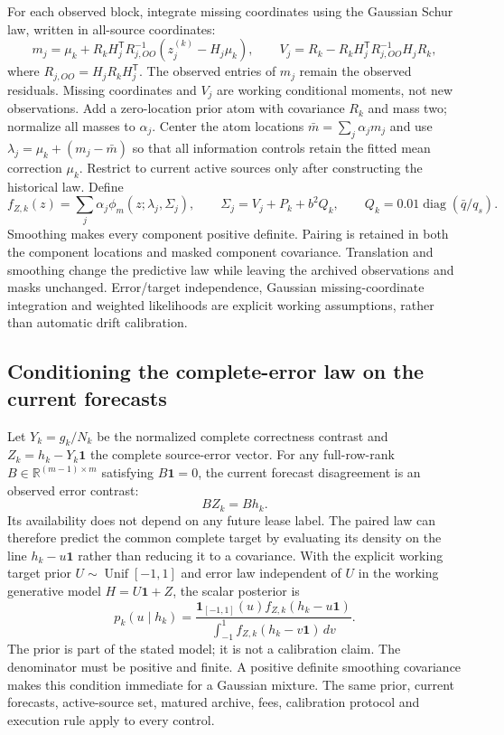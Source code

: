 \documentclass[10pt]{article}
\DeclareMathOperator{\diag}{diag}
\begin{document}
For each observed block, integrate missing coordinates using the Gaussian
Schur law, written in all-source coordinates:
\begin{equation}
 m_j=\mu_k+R_kH_j^{\mathsf T}R_{j,OO}^{-1}
       (z_j^{(k)}-H_j\mu_k),\qquad
 V_j=R_k-R_kH_j^{\mathsf T}R_{j,OO}^{-1}H_jR_k,
 \label{eq:masked-atoms}
\end{equation}
where $R_{j,OO}=H_jR_kH_j^{\mathsf T}$. The observed entries of $m_j$
remain the observed residuals. Missing coordinates and $V_j$ are working
conditional moments, not new observations. Add a zero-location prior atom
with covariance $R_k$ and mass two; normalize all masses to $\alpha_j$.
Center the atom locations $\bar m=\sum_j\alpha_jm_j$ and use
$\lambda_j=\mu_k+(m_j-\bar m)$ so that all information controls retain
the fitted mean correction $\mu_k$. Restrict to current active sources
only after constructing the historical law. Define
\begin{equation}
 f_{Z,k}(z)=\sum_j\alpha_j\phi_m(z;\lambda_j,\Sigma_j),\qquad
 \Sigma_j=V_j+P_k+b^2Q_k,\qquad
 Q_k=0.01\diag(\bar q/q_s).
 \label{eq:paired-error-law}
\end{equation}
Smoothing makes every component positive definite. Pairing is retained in
both the component locations and masked component covariance. Translation
and smoothing change the predictive law while leaving the archived
observations and masks unchanged. Error/target independence, Gaussian
missing-coordinate integration and weighted likelihoods are explicit
working assumptions, rather than automatic drift calibration.

\subsection{Conditioning the complete-error law on the current forecasts}
Let $Y_k=g_k/N_k$ be the normalized complete correctness contrast and
$Z_k=h_k-Y_k\mathbf1$ the complete source-error vector.  For any full-row-rank
$B\in\mathbb R^{(m-1)\times m}$ satisfying $B\mathbf1=0$, the current
forecast disagreement is an observed error contrast:
\begin{equation}
 BZ_k=Bh_k.
 \label{eq:conditional-disagreement-identity}
\end{equation}
Its availability does not depend on any future lease label.  The paired
law can therefore predict the common complete target by evaluating its
density on the line $h_k-u\mathbf1$ rather than reducing it to a covariance.
With the explicit working target prior $U\sim\operatorname{Unif}[-1,1]$
and error law independent of $U$ in the working generative model
$H=U\mathbf1+Z$, the scalar posterior is
\begin{equation}
 p_k(u\mid h_k)=
 \frac{\mathbf1_{[-1,1]}(u)f_{Z,k}(h_k-u\mathbf1)}
 {\int_{-1}^{1}f_{Z,k}(h_k-v\mathbf1)\,dv}.
 \label{eq:complete-target-line-posterior}
\end{equation}
The prior is part of the stated model; it is not a calibration claim.
The denominator must be positive and finite.  A positive definite smoothing
covariance makes this condition immediate for a Gaussian mixture.
The same prior, current forecasts, active-source set, matured archive,
fees, calibration protocol and execution rule apply to every control.
\end{document}
